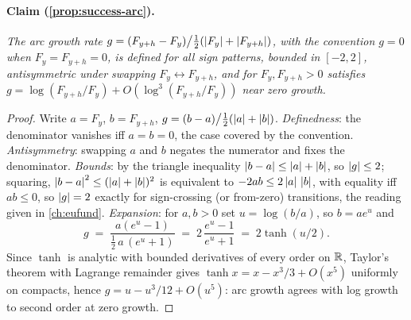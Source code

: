 \paragraph{Claim (\cref{prop:success-arc}).}
\emph{The arc growth rate $g = (F_{y+h} - F_y)\big/\tfrac12(\left|F_y\right| + \left|F_{y+h}\right|)$, with the
convention $g = 0$ when $F_y = F_{y+h} = 0$, is defined for all sign patterns, bounded in $[-2,2]$,
antisymmetric under swapping $F_y \leftrightarrow F_{y+h}$, and for $F_y, F_{y+h} > 0$ satisfies
$g = \log(F_{y+h}/F_y) + O(\log^3(F_{y+h}/F_y))$ near zero growth.}
\begin{proof}
Write $a = F_y$, $b = F_{y+h}$, $g = (b-a)\big/\tfrac12(\left|a\right| + \left|b\right|)$. \emph{Definedness}: the
denominator vanishes iff $a = b = 0$, the case covered by the convention. \emph{Antisymmetry}:
swapping $a$ and $b$ negates the numerator and fixes the denominator. \emph{Bounds}: by the triangle
inequality $\left|b - a\right| \le \left|a\right| + \left|b\right|$, so $\left|g\right| \le 2$; squaring, $\left|b-a\right|^2 \le
(\left|a\right|+\left|b\right|)^2$ is equivalent to $-2ab \le 2\left|a\right|\,\left|b\right|$, with equality iff $ab \le 0$, so
$\left|g\right| = 2$ exactly for sign-crossing (or from-zero) transitions, the reading given in
\cref{ch:eufund}. \emph{Expansion}: for $a, b > 0$ set $u = \log(b/a)$, so $b = a e^{u}$ and
\[
g \;=\; \frac{a(e^{u} - 1)}{\tfrac12\, a\,(e^{u} + 1)} \;=\; 2\,\frac{e^{u} - 1}{e^{u} + 1}
\;=\; 2\tanh(u/2).
\]
Since $\tanh$ is analytic with bounded derivatives of every order on $\mathbb{R}$, Taylor's theorem with
Lagrange remainder gives $\tanh x = x - x^3/3 + O(x^5)$ uniformly on compacts, hence $g = u - u^3/12 +
O(u^5)$: arc growth agrees with log growth to second order at zero growth.
\end{proof}
